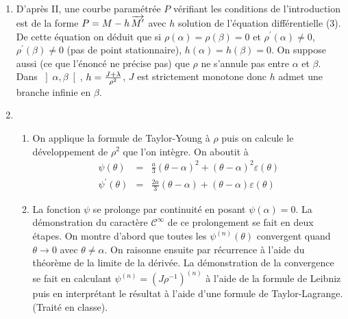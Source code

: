 \begin{enumerate}
\item  D'apr\`{e}s II, une courbe param\'{e}tr\'{e}e $P$ v\'{e}rifiant les
conditions de l'introduction est de la forme $P=M-h\,\overrightarrow{%
M^{\prime }}$ avec $h$ solution de l'\'{e}quation diff\'{e}rentielle (3). De
cette \'{e}quation on d\'{e}duit que si $\rho (\alpha )=\rho (\beta )=0$ et $%
\rho ^{\prime }(\alpha )\neq 0$, $\rho ^{\prime }(\beta )\neq 0$ (pas de
point stationnaire), $h(\alpha )=h(\beta )=0$. On suppose aussi (ce que
l'\'{e}nonc\'{e} ne pr\'{e}cise pas) que $\rho $ ne s'annule pas entre $%
\alpha $ et $\beta $. Dans $\left] \alpha ,\beta \right[ $, $h=\frac{%
J+\lambda }{\rho ^{2}}$, $J$ est strictement monotone donc $h$ admet une
branche infinie en $\beta $.

\item 
\begin{enumerate}
\item  On applique la formule de Taylor-Young \`{a} $\rho $ puis on calcule
le d\'{e}veloppement de $\rho ^{2}$ que l'on int\`{e}gre. On aboutit \`{a} 
\begin{eqnarray*}
\psi (\theta ) &=&\frac{a}{3}(\theta -\alpha )^{2}+(\theta -\alpha
)^{2}\varepsilon (\theta ) \\
\psi ^{\prime }(\theta ) &=&\frac{2a}{3}(\theta -\alpha )+(\theta -\alpha
)\varepsilon (\theta )
\end{eqnarray*}

\item  La fonction $\psi $ se prolonge par continuit\'{e} en posant $\psi
(\alpha )=0$. La d\'{e}monstration du caract\`{e}re $\mathcal{C}^{\infty }$
de ce prolongement se fait en deux \'{e}tapes. On montre d'abord que toutes
les $\psi ^{(n)}(\theta )$ convergent quand $\theta \rightarrow 0$ avec $%
\theta \neq \alpha $. On raisonne ensuite par r\'{e}currence \`{a} l'aide du
th\'{e}or\`{e}me de la limite de la d\'{e}riv\'{e}e.\newline
La d\'{e}monstration de la convergence se fait en calculant $\psi
^{(n)}=(J\rho ^{-1})^{(n)}$ \`{a} l'aide de la formule de Leibniz puis en
interpr\'{e}tant le r\'{e}sultat \`{a} l'aide d'une formule de
Taylor-Lagrange. (Trait\'{e} en classe).


\end{enumerate}
\end{enumerate}
